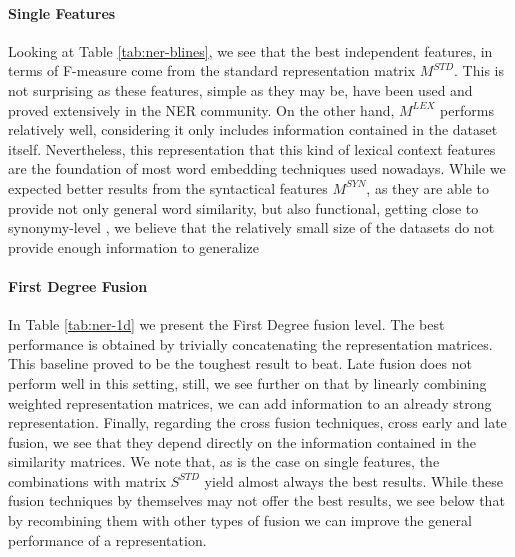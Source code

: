 \documentclass{llncs}
\newcommand\mlex{M^{\scriptscriptstyle LEX}}
\newcommand\msyn{M^{\scriptscriptstyle SYN}}
\newcommand\mstd{M^{\scriptscriptstyle STD}}
\newcommand\sstd{S^{\scriptscriptstyle STD}}
\begin{document}
\paragraph{Single Features}
Looking at Table \ref{tab:ner-blines}, we see that the best independent features, in terms of F-measure come from the standard representation matrix $\mstd$. This is not surprising as these features, simple as they may be, have been used and proved extensively in the NER community. On the other hand, $\mlex$ performs relatively well, considering it only includes information contained in the dataset itself. Nevertheless, this representation that this kind of lexical context features are the foundation of most word embedding techniques used nowadays.
While we expected better results from the syntactical features $\msyn$, as they are able to provide not only general word similarity, but also functional, getting close to synonymy-level \cite{LevyG14},  we believe that the relatively small size of the datasets do not provide enough information to generalize 
\paragraph{First Degree Fusion }
In Table \ref{tab:ner-1d} we present the First Degree fusion level. The best performance is obtained by trivially concatenating the representation matrices. This baseline proved to be the toughest result to beat. Late fusion does not perform well in this setting, still, we see further on that by linearly combining weighted representation matrices, we can add information to an already strong representation. Finally, regarding the cross fusion techniques, cross early and late fusion, we see that they depend directly on the information contained in the similarity matrices. We note that, as is the case on single features, the combinations with matrix $\sstd$ yield almost always the best results. While these fusion techniques by themselves may not offer the best results, we see below that by recombining them with other types of fusion we can improve the general performance of a representation.
\end{document}
